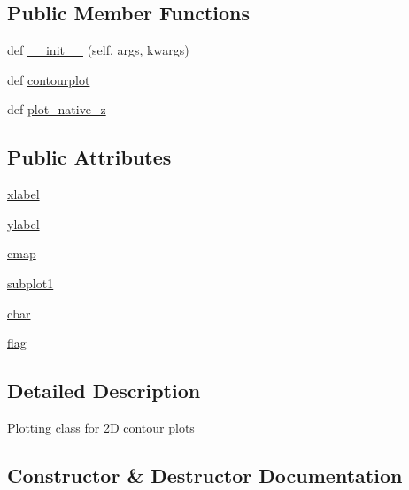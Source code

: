 \subsection*{Public Member Functions}
\begin{DoxyCompactItemize}
\item 
def \hyperlink{class_uni_dec_1_1unidec__modules_1_1plot2d_1_1_plot2d_ac66b98ae8813e973ed3d018bf6d81fd4}{\+\_\+\+\_\+init\+\_\+\+\_\+} (self, args, kwargs)
\item 
def \hyperlink{class_uni_dec_1_1unidec__modules_1_1plot2d_1_1_plot2d_ae38cd5ad1cd12fd0ef940a8345c1908d}{contourplot}
\item 
def \hyperlink{class_uni_dec_1_1unidec__modules_1_1plot2d_1_1_plot2d_ab7c669724727c37898f82d9fceef408a}{plot\+\_\+native\+\_\+z}
\end{DoxyCompactItemize}
\subsection*{Public Attributes}
\begin{DoxyCompactItemize}
\item 
\hyperlink{class_uni_dec_1_1unidec__modules_1_1plot2d_1_1_plot2d_a50e6ccaeb5eee9ff14fcb808206c44e0}{xlabel}
\item 
\hyperlink{class_uni_dec_1_1unidec__modules_1_1plot2d_1_1_plot2d_ab95199f24b946fb1d83fd1cf340b4714}{ylabel}
\item 
\hyperlink{class_uni_dec_1_1unidec__modules_1_1plot2d_1_1_plot2d_ada1d29662069c476cc7a9f02cdfc8bc8}{cmap}
\item 
\hyperlink{class_uni_dec_1_1unidec__modules_1_1plot2d_1_1_plot2d_a808449ffc4e5b0f28d284461832703bc}{subplot1}
\item 
\hyperlink{class_uni_dec_1_1unidec__modules_1_1plot2d_1_1_plot2d_aae30b2754664594456a74e40d9eaebcd}{cbar}
\item 
\hyperlink{class_uni_dec_1_1unidec__modules_1_1plot2d_1_1_plot2d_ac9b0a8d19a535c37ee986b0dbd8705b3}{flag}
\end{DoxyCompactItemize}


\subsection{Detailed Description}
\begin{DoxyVerb}Plotting class for 2D contour plots
\end{DoxyVerb}
 

\subsection{Constructor \& Destructor Documentation}
\hypertarget{class_uni_dec_1_1unidec__modules_1_1plot2d_1_1_plot2d_ac66b98ae8813e973ed3d018bf6d81fd4}{}
